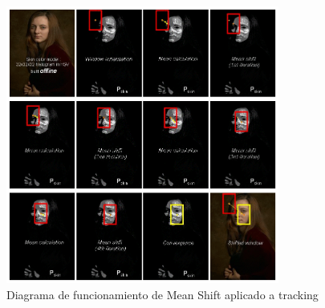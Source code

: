 \begin{figure}
    \centering
    \includegraphics[width=0.8\textwidth]{images/meanshift}
    \caption{Diagrama de funcionamiento de Mean Shift aplicado a tracking}
    \label{fig:meanshiftopencv}
\end{figure}